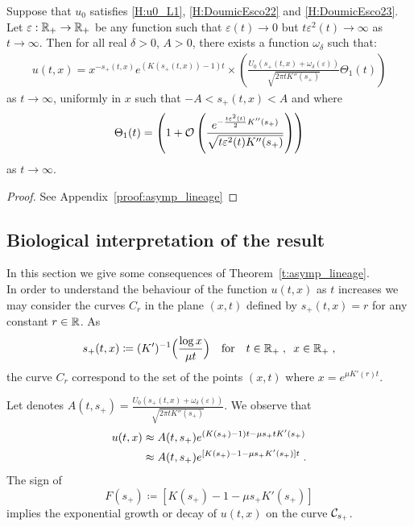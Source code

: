 \documentclass[11pt]{amsart}
\begin{document}
\begin{theorem}\label{t:asymp_lineage}
    Suppose that  $u_0$ satisfies \eqref{H:u0_L1}, \eqref{H:DoumicEsco22} and \eqref{H:DoumicEsco23}. 
    Let $\varepsilon : \mathbb{R}_+ \to \mathbb{R}_+$ be any function such that $\varepsilon(t) \to 0$ but $t\varepsilon^2(t) \to \infty$ as $t \to \infty$. 
    Then for all real $\delta > 0$, $A > 0$, there exists a function $\omega_\delta$ such that:
\begin{equation*}
    \begin{split}
    u(t,x) = x^{-s_+(t,x)}e^{(K(s_+(t,x))-1)t} \times 
    \left( \frac{U_0(s_+(t,x)+\omega_\delta(\varepsilon))}{\sqrt{2\pi tK''(s_+)}} \Theta_1(t)\right)
    \end{split}
\end{equation*}
as $t\to \infty$, uniformly in $x$ such that $-A < s_+(t,x)< A$ and where 
\begin{align*}
    \Theta_1(t) = \left(1 + \mathcal{O} \left( \frac{e^{-\frac{t\varepsilon^2(t)}{2}K''(s_+)}}{\sqrt{t\varepsilon^2(t)K''(s_+)}} \right) \right)
\end{align*}
as $t \to \infty$. 
\end{theorem}
\begin{proof} See Appendix~\ref{proof:asymp_lineage}
\end{proof}

\subsection{Biological interpretation of the result}

In this section we give some consequences of Theorem~\ref{t:asymp_lineage}. \\

In order to understand the behaviour of the function $u(t, x)$ as $t$ increases we may consider the curves $C_r$ in the plane $(x, t)$ defined by $s_+(t, x) = r$ for any constant $r \in \mathbb{R}$. As \begin{align*}
    s_+(t,x) \coloneqq (K')^{-1} \Big( \frac{\log x}{\mu t} \Big)
    \quad \text{for} \quad t \in \mathbb{R}_+ \; , \enspace x \in \mathbb{R}_+
    \; ,
\end{align*}
the curve $C_r$ correspond to the set of the points $(x, t)$ where $x = e^{\mu K'(r) t}.$

Let denotes $A(t,s_+) = \frac{U_0(s_+(t,x)+\omega_\delta(\varepsilon))}{\sqrt{2\pi tK''(s_+)}}$. 
We observe that 
    \begin{align*}
        u(t,x)
        &\approx
        A(t,s_+) e^{(K(s_+)-1)t -  \mu s_+ t K'(s_+)} \\
        &\approx A(t,s_+) e^{[K(s_+)-1 -  \mu s_+ K'(s_+)]t}
        \; .
    \end{align*}
    The sign of 
    \begin{equation}\label{eq:DET91}
        F(s_+) \coloneqq[K(s_+)-1 -  \mu s_+ K'(s_+)]
    \end{equation} implies the exponential growth or decay of $u(t, x)$ on the curve $\mathcal{C}_{s_+}$. \\
\end{document}
